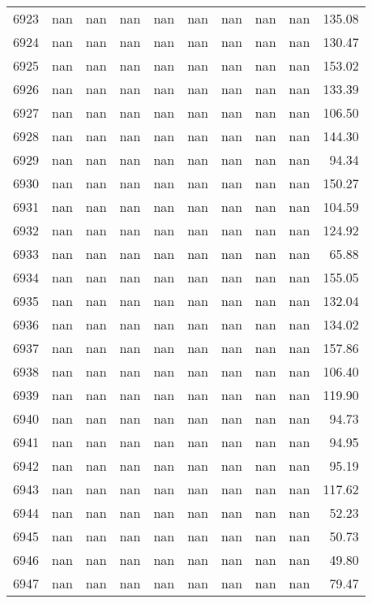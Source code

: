 \begin{tabular}{lrrrrrrrrr}
6923 & nan & nan & nan & nan & nan & nan & nan & nan & 135.08 \\
6924 & nan & nan & nan & nan & nan & nan & nan & nan & 130.47 \\
6925 & nan & nan & nan & nan & nan & nan & nan & nan & 153.02 \\
6926 & nan & nan & nan & nan & nan & nan & nan & nan & 133.39 \\
6927 & nan & nan & nan & nan & nan & nan & nan & nan & 106.50 \\
6928 & nan & nan & nan & nan & nan & nan & nan & nan & 144.30 \\
6929 & nan & nan & nan & nan & nan & nan & nan & nan & 94.34 \\
6930 & nan & nan & nan & nan & nan & nan & nan & nan & 150.27 \\
6931 & nan & nan & nan & nan & nan & nan & nan & nan & 104.59 \\
6932 & nan & nan & nan & nan & nan & nan & nan & nan & 124.92 \\
6933 & nan & nan & nan & nan & nan & nan & nan & nan & 65.88 \\
6934 & nan & nan & nan & nan & nan & nan & nan & nan & 155.05 \\
6935 & nan & nan & nan & nan & nan & nan & nan & nan & 132.04 \\
6936 & nan & nan & nan & nan & nan & nan & nan & nan & 134.02 \\
6937 & nan & nan & nan & nan & nan & nan & nan & nan & 157.86 \\
6938 & nan & nan & nan & nan & nan & nan & nan & nan & 106.40 \\
6939 & nan & nan & nan & nan & nan & nan & nan & nan & 119.90 \\
6940 & nan & nan & nan & nan & nan & nan & nan & nan & 94.73 \\
6941 & nan & nan & nan & nan & nan & nan & nan & nan & 94.95 \\
6942 & nan & nan & nan & nan & nan & nan & nan & nan & 95.19 \\
6943 & nan & nan & nan & nan & nan & nan & nan & nan & 117.62 \\
6944 & nan & nan & nan & nan & nan & nan & nan & nan & 52.23 \\
6945 & nan & nan & nan & nan & nan & nan & nan & nan & 50.73 \\
6946 & nan & nan & nan & nan & nan & nan & nan & nan & 49.80 \\
6947 & nan & nan & nan & nan & nan & nan & nan & nan & 79.47 \\

\end{tabular}
